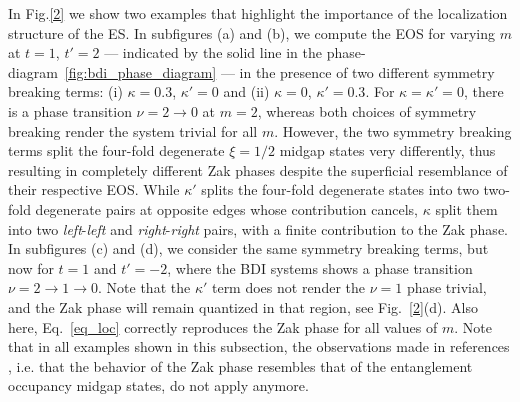 \documentclass[twocolumn,amsmath,longbibliography,amssymb,superscriptaddress]{revtex4-1}
\begin{document}
In Fig.\ref{2} we show two examples that highlight the importance of the localization structure of the ES. 
In subfigures (a) and (b), we compute the EOS for varying $m$ at  $t=1$, $t'=2$ --- indicated by the solid line  in the phase-diagram~\ref{fig:bdi_phase_diagram} --- in the presence of two different symmetry breaking terms: (i) $\kappa =0.3$, $\kappa'=0$ and (ii) $\kappa=0$, $\kappa'=0.3$.  
For $\kappa=\kappa'=0$, there is a phase transition $\nu = 2 \rightarrow 0 $ at $m=2$, whereas both choices of symmetry breaking render the system trivial  for all $m$.
However, the two symmetry breaking terms split the four-fold degenerate $\xi=1/2$ midgap states very differently, thus resulting in completely different Zak phases despite the superficial resemblance of their respective EOS.  
While $\kappa'$ splits the four-fold degenerate states into two two-fold degenerate pairs at opposite edges whose contribution cancels, $\kappa$ split them into two \emph{left}-\emph{left} and \emph{right}-\emph{right} pairs, with a finite contribution to the Zak phase. 
In subfigures (c) and (d), we consider the same symmetry breaking terms, but now for $t=1$ and $t'=-2$, where the BDI systems shows a phase transition  $\nu=2\rightarrow 1\rightarrow 0$. 
Note that the $\kappa'$ term does not render the $\nu=1$ phase trivial, and the Zak phase will remain quantized in that region, see Fig.~\ref{2}(d). 
Also here, Eq.~\ref{eq_loc} correctly reproduces the Zak phase for all values of $m$. 
Note that in all examples shown in this subsection, the observations made in references \cite{Huang2012,Huang2012-2}, i.e. that the behavior of the Zak phase resembles that of the entanglement occupancy midgap states, do not apply anymore. 
\end{document}
